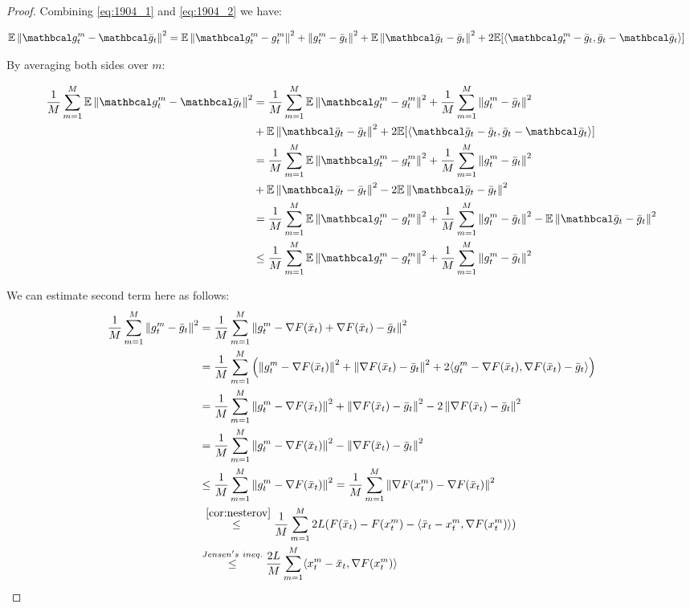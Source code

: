 \begin{proof}
    Combining \eqref{eq:1904_1} and \eqref{eq:1904_2} we have:

    \begin{align}
        \E \norm{\mc{g}^m_t - \mc{\bar{g}}_t}^2
        &= \E \norm{\mc{g}^m_t - g^m_t}^2 
        + \norm{g^m_t - \bar{g}_t}^2 + \E \norm{\mc{\bar{g}}_t - \bar{g}_t}^2 + 2\E [\inner{\mc{g}^m_t - \bar{g}_t}{\bar{g}_t - \mc{\bar{g}}_t}]
    \end{align}

    By averaging both sides over $m$:

    \begin{align}
        \fsumm{m=1}{M} \E \norm{\mc{g}^m_t - \mc{\bar{g}}_t}^2
        &= \fsumm{m=1}{M} \E \norm{\mc{g}^m_t - g^m_t}^2 
        + \fsumm{m=1}{M} \norm{g^m_t - \bar{g}_t}^2 \\
        &+ \E \norm{\mc{\bar{g}}_t - \bar{g}_t}^2 
        + 2\E [\inner{\mc{\bar{g}}_t - \bar{g}_t}{\bar{g}_t - \mc{\bar{g}}_t}] \\
        &= \fsumm{m=1}{M} \E \norm{\mc{g}^m_t - g^m_t}^2 
        + \fsumm{m=1}{M} \norm{g^m_t - \bar{g}_t}^2 \\
        &+ \E \norm{\mc{\bar{g}}_t - \bar{g}_t}^2 
        - 2\E \norm{\mc{\bar{g}}_t - \bar{g}_t}^2 \\
        &= \fsumm{m=1}{M} \E \norm{\mc{g}^m_t - g^m_t}^2 
        + \fsumm{m=1}{M} \norm{g^m_t - \bar{g}_t}^2
        - \E \norm{\mc{\bar{g}}_t - \bar{g}_t}^2 \\
        &\leq \fsumm{m=1}{M} \E \norm{\mc{g}^m_t - g^m_t}^2 
        + \fsumm{m=1}{M} \norm{g^m_t - \bar{g}_t}^2 \label{eq:1904_3}
    \end{align}

    We can estimate second term here as follows:
    \begin{align}
        \fsumm{m=1}{M} \norm{g^m_t - \bar{g}_t}^2 
        &=
        \fsumm{m=1}{M} \norm{g^m_t - \nabla F(\bar{x}_t) + \nabla F(\bar{x}_t) - \bar{g}_t}^2 \\
        &=
        \fsumm{m=1}{M} \left( \norm{g^m_t - \nabla F(\bar{x}_t)}^2 + \norm{\nabla F(\bar{x}_t) - \bar{g}_t}^2 + 2 \inner{g^m_t - \nabla F(\bar{x}_t)}{\nabla F(\bar{x}_t) - \bar{g}_t} \right) \\
        &= 
        \fsumm{m=1}{M} \norm{g^m_t - \nabla F(\bar{x}_t)}^2 + \norm{\nabla F(\bar{x}_t) - \bar{g}_t}^2 - 2 \norm{\nabla F(\bar{x}_t) - \bar{g}_t}^2 \\
        &= 
        \fsumm{m=1}{M} \norm{g^m_t - \nabla F(\bar{x}_t)}^2 - \norm{\nabla F(\bar{x}_t) - \bar{g}_t}^2 \\
        &\leq 
        \fsumm{m=1}{M} \norm{g^m_t - \nabla F(\bar{x}_t)}^2
        =
        \fsumm{m=1}{M} \norm{\nabla F(x^m_t) - \nabla F(\bar{x}_t)}^2 \\
        &\overset{~\ref{cor:nesterov}}{\leq}
        \fsumm{m=1}{M} 2L (F(\bar{x}_t) - F(x^m_t) - \inner{\bar{x}_t - x^m_t}{\nabla F(x^m_t)}) \\
        &\overset{Jensen's \ ineq.}{\leq}
        \frac{2L}{M} \summ{m=1}{M} \inner{x^m_t - \bar{x}_t}{\nabla F(x^m_t)}
        \label{eq:2004_1}
    \end{align}


\end{proof}
